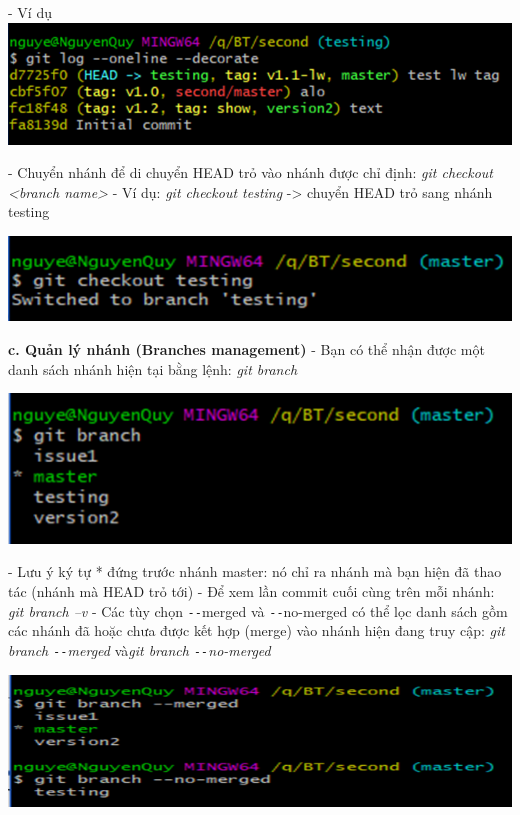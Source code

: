 \documentclass[12pt,a4paper]{report}
\begin{document}
	\label{fig:screenshot052}
\vskip 0.4cm\vskip 0.4cm
- Ví dụ
\vskip 0.4cm
	\includegraphics[width=0.8\linewidth]{screenshot053}
	
	\label{fig:screenshot053}
\vskip 0.4cm\vskip 0.4cm
- Chuyển nhánh để di chuyển HEAD trỏ vào nhánh được chỉ định: {\it git checkout <branch name>} \vskip 0.4cm
- Ví dụ: \textit{git checkout testing} -> chuyển HEAD trỏ sang nhánh testing\vskip 0.4cm

	\includegraphics[width=0.8\linewidth]{screenshot054}

	\label{fig:screenshot054}
\vskip 0.4cm\vskip 0.4cm
{\bf c. Quản lý nhánh (Branches management)}\vskip 0.4cm
- Bạn có thể nhận được một danh sách nhánh hiện tại bằng lệnh: {\it git branch}\vskip 0.4cm

	\includegraphics[width=0.8\linewidth]{screenshot055}
	
	\label{fig:screenshot055}
\vskip 0.4cm\vskip 0.4cm
- Lưu ý ký tự * đứng trước nhánh master: nó chỉ ra nhánh mà bạn hiện đã thao tác (nhánh mà HEAD trỏ tới)\vskip 0.4cm
- Để xem lần commit cuối cùng trên mỗi nhánh: {\it git branch –v}\vskip 0.4cm
- Các tùy chọn \texttt{-{}-}merged và \texttt{-{}-}no-merged có thể lọc danh sách gồm các nhánh đã hoặc chưa được kết hợp (merge) vào nhánh hiện đang truy cập: {\it git branch \texttt{-{}-}merged} và{\it git branch \texttt{-{}-}no-merged}\vskip 0.4cm

	\includegraphics[width=0.8\linewidth]{screenshot056}
\end{document}
